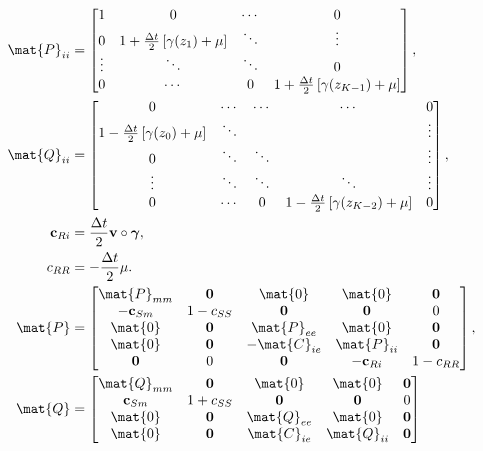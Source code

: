 \documentclass{jpmarticle}
\renewcommand{\vec}[1]{\boldsymbol{\mathrm{#1}}}
\let\subequationsorig\subequations%
\let\endsubequationsorig\endsubequations%
\renewenvironment{subequations}{
  \subequationsorig
  \renewcommand{\theequation}{\theparentequation.\arabic{equation}}
}{
  \endsubequationsorig
}
\begin{document}
\begin{subequations}
\begin{align}
    \\
    \mat{P}_{ii} &=
    \begin{bmatrix}
      1 & 0 & \cdots & 0
      \\
      0 & 1 + \frac{\Delta t}{2} \left[\gamma(z_1) + \mu\right] &
      \ddots & \vdots
      \\
      \vdots & \ddots & \ddots & 0
      \\
      0 & \cdots & 0 &
      1 + \frac{\Delta t}{2} \left[\gamma(z_{K - 1}) + \mu\right]
    \end{bmatrix},
    \\
    \mat{Q}_{ii} &=
    \begin{bmatrix}
      0 & \cdots & \cdots & \cdots & 0
      \\
      1 - \frac{\Delta t}{2} \left[\gamma(z_0) + \mu\right] & \ddots &
      & & \vdots
      \\
      0 & \ddots & \ddots & & \vdots
      \\
      \vdots & \ddots & \ddots & \ddots & \vdots
      \\
      0 & \cdots & 0 &
      1 - \frac{\Delta t}{2} \left[\gamma(z_{K - 2}) + \mu\right] & 0
    \end{bmatrix},
    \\
    \vec{c}_{Ri} &=
    \frac{\Delta t}{2} \vec{v} \circ \vec{\gamma},
    \\
    c_{RR} &=
    - \frac{\Delta t}{2} \mu.
    \\
    \mat{P} &=
    \begin{bmatrix}
      \mat{P}_{mm} & \vec{0} & \mat{0} & \mat{0} & \vec{0}
      \\
      - \vec{c}_{Sm} & 1 - c_{SS} & \vec{0} & \vec{0} & 0
      \\
      \mat{0} & \vec{0} & \mat{P}_{ee} & \mat{0} & \vec{0}
      \\
      \mat{0} & \vec{0} & - \mat{C}_{ie} & \mat{P}_{ii} & \vec{0}
      \\
      \vec{0} & 0 & \vec{0} & - \vec{c}_{Ri} & 1 - c_{RR}
    \end{bmatrix},
    \\
    \mat{Q} &=
    \begin{bmatrix}
      \mat{Q}_{mm} & \vec{0} & \mat{0} & \mat{0} & \vec{0}
      \\
      \vec{c}_{Sm} & 1 + c_{SS} & \vec{0} & \vec{0} & 0
      \\
      \mat{0} & \vec{0} & \mat{Q}_{ee} & \mat{0} & \vec{0}
      \\
      \mat{0} & \vec{0} & \mat{C}_{ie} & \mat{Q}_{ii} & \vec{0}

\end{bmatrix}
\end{align}
\end{subequations}
\end{document}
